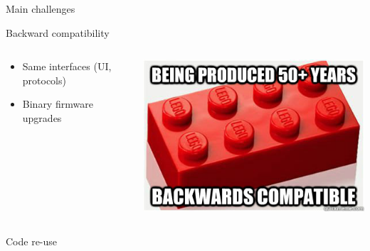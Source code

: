 \documentclass{beamer}
\begin{document}
  \begin{frame}{Main challenges}

	  \begin{block}{Backward compatibility}

		\begin{columns}[onlytextwidth]
			\begin{column}{0.6\textwidth}
				\begin{itemize}
					\item Same interfaces (UI, protocols) 
					\item Binary firmware upgrades
				\end{itemize}
			\end{column}

			\begin{column}{0.4\textwidth}
				\includegraphics[width=\textwidth]{backward-compat.jpg}
			\end{column}
		\end{columns}
	  \end{block}
	  \pause

	  \begin{block}{Code re-use}


\end{block}
\end{frame}
\end{document}

